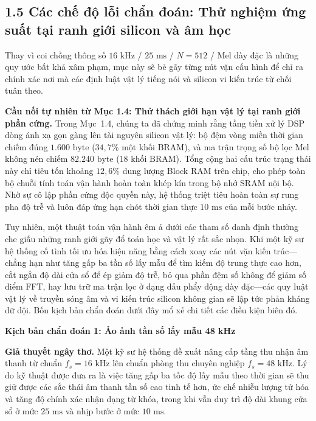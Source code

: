 \documentclass[11pt,a4paper]{article}
\newcommand{\diagsec}[1]{\vspace{1.6pt}\textbf{\large #1}\vspace{0.5pt}\par}
\begin{document}
\setlength{\abovedisplayskip}{1.0pt}
\setlength{\belowdisplayskip}{1.0pt}

\subsection*{1.5 Các chế độ lỗi chẩn đoán: Thử nghiệm ứng suất tại ranh giới silicon và âm học}

\begin{learningobj}
Thay vì coi chồng thông số $16\text{ kHz}$ / $25\text{ ms}$ / $N=512$ / Mel dày đặc là những quy ước bất khả xâm phạm, mục này sẽ bẻ gãy từng nút vặn cấu hình để chỉ ra chính xác nơi mà các định luật vật lý tiếng nói và silicon vi kiến trúc từ chối tuân theo.
\end{learningobj}

\textbf{Cầu nối tự nhiên từ Mục 1.4: Thử thách giới hạn vật lý tại ranh giới phần cứng.} Trong Mục~1.4, chúng ta đã chứng minh rằng tầng tiền xử lý DSP dòng ánh xạ gọn gàng lên tài nguyên silicon vật lý: bộ đệm vòng miền thời gian chiếm đúng $1{.}600\text{ byte}$ ($34{,}7\%$ một khối BRAM), và ma trận trọng số bộ lọc Mel không nén chiếm $82{.}240\text{ byte}$ ($18\text{ khối BRAM}$). Tổng cộng hai cấu trúc trạng thái này chỉ tiêu tốn khoảng $12{,}6\%$ dung lượng Block RAM trên chip, cho phép toàn bộ chuỗi tính toán vận hành hoàn toàn khép kín trong bộ nhớ SRAM nội bộ. Nhờ sự cô lập phần cứng độc quyền này, hệ thống triệt tiêu hoàn toàn sự rung pha độ trễ và luôn đáp ứng hạn chót thời gian thực $10\text{ ms}$ của mỗi bước nhảy.

Tuy nhiên, một thuật toán vận hành êm ả dưới các tham số danh định thường che giấu những ranh giới gãy đổ toán học và vật lý rất sắc nhọn. Khi một kỹ sư hệ thống cố tình tối ưu hóa hiệu năng bằng cách xoay các nút vặn kiến trúc---chẳng hạn như tăng gấp ba tần số lấy mẫu để tìm kiếm độ trung thực cao hơn, cắt ngắn độ dài cửa sổ để ép giảm độ trễ, bỏ qua phần đệm số không để giảm số điểm FFT, hay lưu trữ ma trận lọc ở dạng dấu phẩy động dày đặc---các quy luật vật lý về truyền sóng âm và vi kiến trúc silicon không gian sẽ lập tức phản kháng dữ dội. Bốn kịch bản chẩn đoán dưới đây mổ xẻ chi tiết các điều kiện biên đó.

\diagsec{Kịch bản chẩn đoán 1: Ảo ảnh tần số lấy mẫu 48 kHz}

\textbf{Giả thuyết ngây thơ.} Một kỹ sư hệ thống đề xuất nâng cấp tầng thu nhận âm thanh từ chuẩn $f_s = 16\text{ kHz}$ lên chuẩn phòng thu chuyên nghiệp $f_s = 48\text{ kHz}$. Lý do kỹ thuật được đưa ra là việc tăng gấp ba tốc độ lấy mẫu theo thời gian sẽ thu giữ được các sắc thái âm thanh tần số cao tinh tế hơn, ức chế nhiễu lượng tử hóa và tăng độ chính xác nhận dạng từ khóa, trong khi vẫn duy trì độ dài khung cửa sổ ở mức $25\text{ ms}$ và nhịp bước ở mức $10\text{ ms}$.
\end{document}
